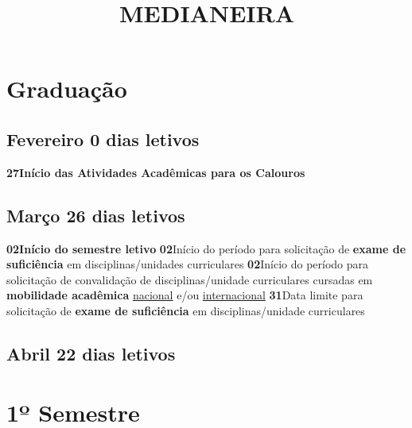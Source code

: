 \documentclass[thesis]{hmcposter}
\author{ }
\title{MEDIANEIRA}
\begin{document}
\begin{poster}
\normalsize\section{\color{hmcorange}Graduação}\subsection{Fevereiro \hfill 0 dias letivos}\textbf{27}\qquad \textbf{Início das Atividades Acadêmicas para os Calouros} \newline \null\subsection{Março \hfill 26 dias letivos}\textbf{02}\qquad \textbf{Início do semestre letivo} \newline \null\textbf{02}\qquad Início do período para solicitação de \textbf{exame de suficiência} em disciplinas/unidades curriculares \newline \null\textbf{02}\qquad Início do período para solicitação de convalidação de disciplinas/unidade curriculares cursadas em \textbf{mobilidade acadêmica} \underline{nacional} e/ou \underline{internacional} \newline \null\textbf{31}\qquad Data limite para solicitação de \textbf{exame de suficiência} em disciplinas/unidade curriculares \newline \null\subsection{Abril \hfill 22 dias letivos}\vfill\null
\columnbreak
\section{\hfill \color{hmcorange}1º Semestre}

\end{poster}
\end{document}
